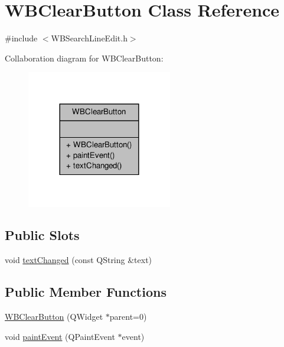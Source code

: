 \hypertarget{class_w_b_clear_button}{\section{W\-B\-Clear\-Button Class Reference}
\label{dc/d88/class_w_b_clear_button}
}


{\ttfamily \#include $<$W\-B\-Search\-Line\-Edit.\-h$>$}



Collaboration diagram for W\-B\-Clear\-Button\-:
\nopagebreak
\begin{figure}[H]
\begin{center}
\leavevmode
\includegraphics[width=180pt]{d0/d47/class_w_b_clear_button__coll__graph}
\end{center}
\end{figure}
\subsection*{Public Slots}
\begin{DoxyCompactItemize}
\item 
void \hyperlink{class_w_b_clear_button_a6fe10724fcade7661f5a997925675b37}{text\-Changed} (const Q\-String \&text)
\end{DoxyCompactItemize}
\subsection*{Public Member Functions}
\begin{DoxyCompactItemize}
\item 
\hyperlink{class_w_b_clear_button_af088f6237be0c4f7cfb16badf939dcc7}{W\-B\-Clear\-Button} (Q\-Widget $\ast$parent=0)
\item 
void \hyperlink{class_w_b_clear_button_ade85a7f0004ef49441649d157a8a877d}{paint\-Event} (Q\-Paint\-Event $\ast$event)
\end{DoxyCompactItemize}


